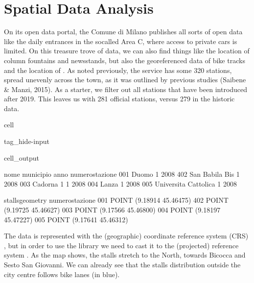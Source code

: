 \documentclass[letterpaper,10pt,english]{jupyterBook}
\begin{document}
\section{Spatial Data Analysis}
\label{\detokenize{03-data_ingestion_and_spatial_operations:spatial-data-analysis}}
\sphinxAtStartPar
On its open data portal, the Comune di Milano publishes all sorts of open data \sphinxhyphen{} like the daily entrances in the so\sphinxhyphen{}called Area C, where access to private cars is limited. On this treasure trove of data, we can also find things like the location of column fountains and newsstands, but also the geo\sphinxhyphen{}referenced data of bike tracks and the location of . As noted previously, the service has some 320 stations, spread unevenly across the town, as it was outlined by previous studies (Saibene \& Manzi, 2015). As a starter, we filter out all stations that have been introduced after 2019. This leaves us with 281 official stations, versus 279 in the historic data.

\begin{sphinxuseclass}{cell}
\begin{sphinxuseclass}{tag_hide-input}
\begin{sphinxuseclass}{cell_output}
\begin{sphinxVerbatim}[commandchars=\\\{\}]
                                  nome  municipio  anno  \PYGZbs{}
numero\PYGZus{}stazione                                           
001                              Duomo          1  2008   
402                     San Babila Bis          1  2008   
003                          Cadorna 1          1  2008   
004                              Lanza          1  2008   
005              Universita\PYGZsq{} Cattolica          1  2008   

                          stalls\PYGZus{}geometry  
numero\PYGZus{}stazione                            
001              POINT (9.18914 45.46475)  
402              POINT (9.19725 45.46627)  
003              POINT (9.17566 45.46800)  
004              POINT (9.18197 45.47227)  
005              POINT (9.17641 45.46312)  
\end{sphinxVerbatim}

\end{sphinxuseclass}
\end{sphinxuseclass}
\end{sphinxuseclass}
\sphinxAtStartPar
The data is represented with the (geographic) coordinate reference system (CRS) , but in order to use the  library we need to cast it to the (projected) reference system . As the map shows, the stalls stretch to the North, towards Bicocca and Sesto San Giovanni. We can already see that the stalls distribution outside the city centre follows bike lanes (in blue).
\end{document}
